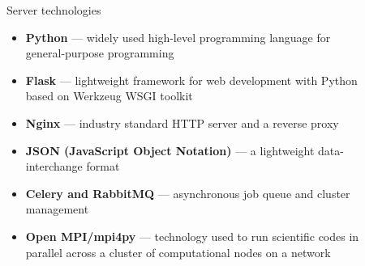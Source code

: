 \documentclass[final]{beamer}
\newlength{\sepwid}
\newlength{\onecolwid}
\newlength{\twocolwid}
\begin{document}
\begin{frame}[t]
\begin{columns}[t]
\begin{column}{\onecolwid}
\end{column} %

\begin{column}{\sepwid}\end{column} %

\begin{column}{\twocolwid} %

\begin{columns}[t,totalwidth=\twocolwid] %

\begin{column}{\onecolwid}\vspace{-.6in} %


\begin{block}{\faServer{} Server technologies}

\begin{itemize}
  \item \textbf{Python} --- widely used high-level programming language for general-purpose programming
  \item \textbf{Flask} --- lightweight framework for web development with Python based on Werkzeug WSGI toolkit
  \item \textbf{Nginx} --- industry standard HTTP server and a reverse proxy
  \item \textbf{JSON (JavaScript Object Notation)} --- a lightweight data-interchange format
  \item \textbf{Celery and RabbitMQ} --- asynchronous job queue and cluster management
  \item \textbf{Open MPI/mpi4py} --- technology used to run scientific codes in parallel across a cluster of computational nodes on a network
\end{itemize}

\end{block}


\end{column} %
%
\begin{column}{\onecolwid}\vspace{-.6in} %


\end{column}
\end{columns}
\end{column}
\end{columns}
\end{frame}
\end{document}
